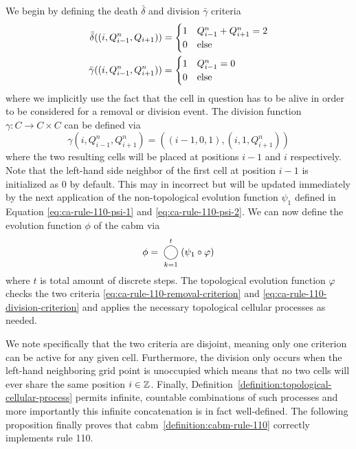 \begin{definition}
    We begin by defining the death $\bar{\delta}$ and division $\bar{\gamma}$ criteria
    \begin{align}
        \bar{\delta}((i,Q^n_{i-1},Q_{i+1})) &= \begin{cases}
            1   &Q^n_{i-1}+Q^n_{i+1}=2\\
            0   &\text{\normalfont else}
        \end{cases}
        \label{eq:ca-rule-110-removal-criterion}\\
        \bar{\gamma}((i,Q^n_{i-1},Q^n_{i+1})) &= \begin{cases}
            1   &Q^n_{i-1}=0\\
            0   &\text{\normalfont else}
        \end{cases}
        \label{eq:ca-rule-110-division-criterion}
    \end{align}
    where we implicitly use the fact that the cell in question has to be alive in order to be
    considered for a removal or division event.
    The division function $\gamma:C\rightarrow C\times C$ can be defined via
    \begin{equation}
        \gamma(i,Q^n_{i-1},Q^n_{i+1})=((i-1,0,1),(i,1,Q^n_{i+1}))
    \end{equation}
    where the two resulting cells will be placed at positions $i-1$ and $i$ respectively.
    Note that the left-hand side neighbor of the first cell at position $i-1$ is initialized as $0$
    by default.
    This may in incorrect but will be updated immediately by the next application of the
    non-topological evolution function $\psi_1$ defined in Equation \eqref{eq:ca-rule-110-psi-1} and
    \eqref{eq:ca-rule-110-psi-2}.
    We can now define the evolution function $\phi$ of the \ac{cabm} via
    \begin{equation}
        \phi = \bigcomp_{k=1}^t (\psi_1\circ\varphi)
    \end{equation}
    where $t$ is total amount of discrete steps.
    The topological evolution function $\varphi$ checks the two criteria
    \eqref{eq:ca-rule-110-removal-criterion} and \eqref{eq:ca-rule-110-division-criterion} and
    applies the necessary topological cellular processes as needed.
    \label{definition:cabm-rule-110}
\end{definition}

We note specifically that the two criteria are disjoint, meaning only one criterion can be active
for any given cell.
Furthermore, the division only occurs when the left-hand neighboring grid point is unoccupied
which means that no two cells will ever share the same position $i\in\mathbb{Z}$.
Finally, Definition~\ref{definition:topological-cellular-process} permits infinite, countable
combinations of such processes and more importantly this infinite concatenation is in fact
well-defined.
The following proposition finally proves that \ac{cabm}~\ref{definition:cabm-rule-110} correctly
implements rule 110.

